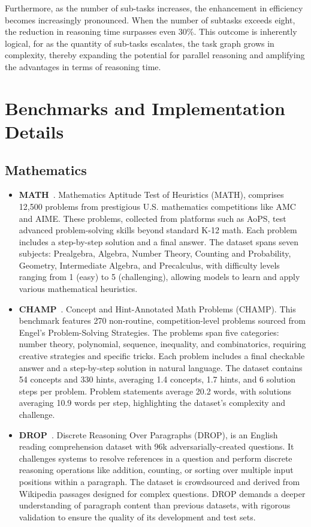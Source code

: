 Furthermore, as the number of sub-tasks increases, the enhancement in efficiency becomes increasingly pronounced. When the number of subtasks exceeds eight, the reduction in reasoning time surpasses even 30\%. This outcome is inherently logical, for as the quantity of sub-tasks escalates, the task graph grows in complexity, thereby expanding the potential for parallel reasoning and amplifying the advantages in terms of reasoning time.


\section{Benchmarks and Implementation Details}

\subsection{Mathematics}

\begin{itemize}
    \item \textbf{MATH}~\cite{hendrycks2021measuring}. Mathematics Aptitude Test of Heuristics (MATH), comprises 12,500 problems from prestigious U.S. mathematics competitions like AMC and AIME. These problems, collected from platforms such as AoPS, test advanced problem-solving skills beyond standard K-12 math. Each problem includes a step-by-step solution and a final answer. The dataset spans seven subjects: Prealgebra, Algebra, Number Theory, Counting and Probability, Geometry, Intermediate Algebra, and Precalculus, with difficulty levels ranging from 1 (easy) to 5 (challenging), allowing models to learn and apply various mathematical heuristics.
    
    \item \textbf{CHAMP}~\cite{mao2024champ}. Concept and Hint-Annotated Math Problems (CHAMP). This benchmark features 270 non-routine, competition-level problems sourced from Engel's Problem-Solving Strategies. The problems span five categories: number theory, polynomial, sequence, inequality, and combinatorics, requiring creative strategies and specific tricks. Each problem includes a final checkable answer and a step-by-step solution in natural language. The dataset contains 54 concepts and 330 hints, averaging 1.4 concepts, 1.7 hints, and 6 solution steps per problem. Problem statements average 20.2 words, with solutions averaging 10.9 words per step, highlighting the dataset's complexity and challenge.
    
    \item \textbf{DROP}~\cite{dua2019drop}. Discrete Reasoning Over Paragraphs (DROP), is an English reading comprehension dataset with 96k adversarially-created questions. It challenges systems to resolve references in a question and perform discrete reasoning operations like addition, counting, or sorting over multiple input positions within a paragraph. The dataset is crowdsourced and derived from Wikipedia passages designed for complex questions. DROP demands a deeper understanding of paragraph content than previous datasets, with rigorous validation to ensure the quality of its development and test sets.
\end{itemize}

